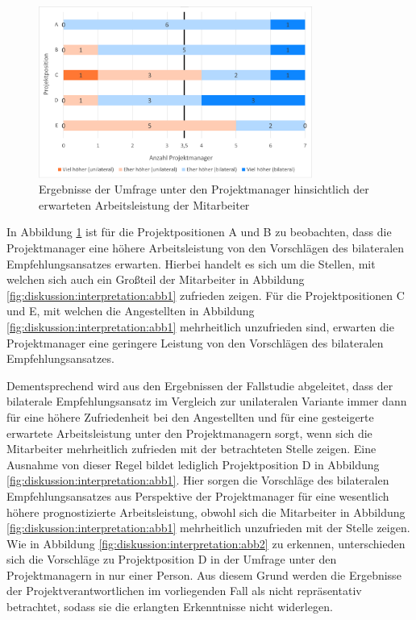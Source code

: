 \begin{figure}[h]
	\centering
	\includegraphics[width=0.8\textwidth]{gfx/ergebnisse-projektmanager-arbeitsleistung.png}	
	\caption{Ergebnisse der Umfrage unter den Projektmanager hinsichtlich der erwarteten Arbeitsleistung der Mitarbeiter}
	\label{fig:diskussion:interpretation:abb4}
\end{figure}

In Abbildung \ref{fig:diskussion:interpretation:abb4} ist für die Projektpositionen A und B zu beobachten, dass die Projektmanager eine höhere Arbeitsleistung von den Vorschlägen des bilateralen Empfehlungsansatzes erwarten. Hierbei handelt es sich um die Stellen, mit welchen sich auch ein Großteil der Mitarbeiter in Abbildung \ref{fig:diskussion:interpretation:abb1} zufrieden zeigen. Für die Projektpositionen C und E, mit welchen die Angestellten in Abbildung \ref{fig:diskussion:interpretation:abb1} mehrheitlich unzufrieden sind, erwarten die Projektmanager eine geringere Leistung von den Vorschlägen des bilateralen Empfehlungsansatzes.

Dementsprechend wird aus den Ergebnissen der Fallstudie abgeleitet, dass der bilaterale Empfehlungsansatz im Vergleich zur unilateralen Variante immer dann für eine höhere Zufriedenheit bei den Angestellten und für eine gesteigerte erwartete Arbeitsleistung unter den Projektmanagern sorgt, wenn sich die Mitarbeiter mehrheitlich zufrieden mit der betrachteten Stelle zeigen. Eine Ausnahme von dieser Regel bildet lediglich Projektposition D in Abbildung \ref{fig:diskussion:interpretation:abb1}. Hier sorgen die Vorschläge des bilateralen Empfehlungsansatzes aus Perspektive der Projektmanager für eine wesentlich höhere prognostizierte Arbeitsleistung, obwohl sich die Mitarbeiter in Abbildung \ref{fig:diskussion:interpretation:abb1} mehrheitlich unzufrieden mit der Stelle zeigen. Wie in Abbildung \ref{fig:diskussion:interpretation:abb2} zu erkennen, unterschieden sich die Vorschläge zu Projektposition D in der Umfrage unter den Projektmanagern in nur einer Person. Aus diesem Grund werden die Ergebnisse der Projektverantwortlichen im vorliegenden Fall als nicht repräsentativ betrachtet, sodass sie die erlangten Erkenntnisse nicht widerlegen.

